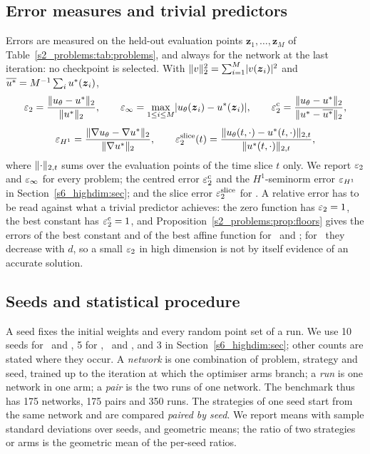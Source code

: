 \subsection{Error measures and trivial predictors}\label{s3_methods:sec:errors}

Errors are measured on the held-out evaluation points
$\boldsymbol{z}_1,\dots,\boldsymbol{z}_M$ of Table~\ref{s2_problems:tab:problems}, and
always for the network at the last iteration: no checkpoint is selected. With
$\lVert v\rVert_2^2=\sum_{i=1}^{M}\lvert v(\boldsymbol{z}_i)\rvert^2$ and
$\overline{u^{*}}=M^{-1}\sum_{i}u^{*}(\boldsymbol{z}_i)$,
\begin{equation}\label{s3_methods:eq:errors}
\begin{gathered}
\varepsilon_{2}=\frac{\lVert u_{\theta}-u^{*}\rVert_2}{\lVert u^{*}\rVert_2},\qquad
\varepsilon_{\infty}=\max_{1\le i\le M}\lvert u_{\theta}(\boldsymbol{z}_i)-u^{*}(\boldsymbol{z}_i)\rvert,\qquad
\varepsilon_{2}^{\mathrm{c}}=\frac{\lVert u_{\theta}-u^{*}\rVert_2}{\lVert u^{*}-\overline{u^{*}}\rVert_2},\\[0.4em]
\varepsilon_{H^{1}}=\frac{\lVert \nabla u_{\theta}-\nabla u^{*}\rVert_2}{\lVert \nabla u^{*}\rVert_2},\qquad
\varepsilon_{2}^{\mathrm{slice}}(t)=\frac{\lVert u_{\theta}(t,\cdot)-u^{*}(t,\cdot)\rVert_{2,t}}{\lVert u^{*}(t,\cdot)\rVert_{2,t}},
\end{gathered}
\end{equation}
where $\lVert \cdot\rVert_{2,t}$ sums over the evaluation points of the time slice $t$ only.
We report $\varepsilon_{2}$ and $\varepsilon_{\infty}$ for every problem; the centred error $\varepsilon_{2}^{\mathrm{c}}$ and the
$H^1$-seminorm error $\varepsilon_{H^{1}}$ in Section~\ref{s6_highdim:sec}; and the slice error
$\varepsilon_{2}^{\mathrm{slice}}$ for \PH. A relative error has to be read against what a trivial predictor achieves:
the zero function has $\varepsilon_{2}=1$, the best constant has $\varepsilon_{2}^{\mathrm{c}}=1$, and
Proposition~\ref{s2_problems:prop:floors} gives the errors of the best constant and of the
best affine function for \Pone\ and \Ptwo; for \Pone\ they decrease with $d$, so a small
$\varepsilon_{2}$ in high dimension is not by itself evidence of an accurate solution.

\subsection{Seeds and statistical procedure}\label{s3_methods:sec:stats}

A seed fixes the initial weights and every random point set of a run. We use 10 seeds for
\PH\ and \PLtwo, 5 for \PWone, \PWtwo\ and \PLthree, and 3 in
Section~\ref{s6_highdim:sec}; other counts are stated where they occur. A \emph{network} is
one combination of problem, strategy and seed, trained up to the iteration at which the
optimiser arms branch; a \emph{run} is one network in one arm; a \emph{pair} is the two runs
of one network. The benchmark thus has 175 networks, 175 pairs and 350 runs. The strategies
of one seed start from the same network and are compared \emph{paired by seed}. We report
means with sample standard deviations over seeds, and geometric means; the ratio of two
strategies or arms is the geometric mean of the per-seed ratios.

